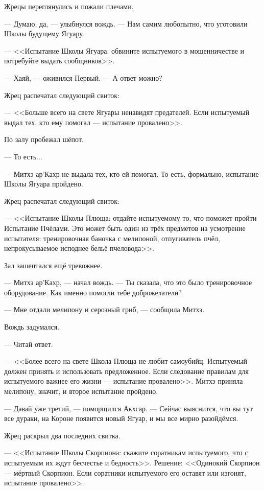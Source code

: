 Жрецы переглянулись и пожали плечами.

--- Думаю, да, --- улыбнулся вождь.
--- Нам самим любопытно, что уготовили Школы будущему Ягуару.

\textspace

--- <<Испытание Школы Ягуара: обвините испытуемого в мошенничестве и потребуйте выдать сообщников>>.

--- Хаяй, --- оживился Первый.
--- А ответ можно?

Жрец распечатал следующий свиток:

--- <<Больше всего на свете Ягуары ненавидят предателей.
Если испытуемый выдал тех, кто ему помогал --- испытание провалено>>.

По залу пробежал шёпот.

--- То есть...

--- Митхэ ар'Кахр не выдала тех, кто ей помогал.
То есть, формально, испытание Школы Ягуара пройдено.

Жрец распечатал следующий свиток:

--- <<Испытание Школы Плюща: отдайте испытуемому то, что поможет пройти Испытание Пчёлами.
Это может быть один из трёх предметов на усмотрение испытателя: тренировочная баночка с мелипоной, отпугиватель пчёл, непрокусываемое исподнее бельё пчеловода>>.

Зал зашептался ещё тревожнее.

--- Митхэ ар'Кахр, --- начал вождь.
--- Ты сказала, что это было тренировочное оборудование.
Как именно помогли тебе доброжелатели?

--- Мне отдали мелипону и серозный гриб, --- сообщила Митхэ.

Вождь задумался.

--- Читай ответ.

--- <<Более всего на свете Школа Плюща не любит самоубийц.
Испытуемый должен принять и использовать предложенное.
Если следование правилам для испытуемого важнее его жизни --- испытание провалено>>.
Митхэ приняла мелипону, значит, и второе испытание пройдено.

--- Давай уже третий, --- поморщился Акхсар.
--- Сейчас выяснится, что вы тут все дураки, на Короне появится новый Ягуар, и мы все мирно разойдёмся.

Жрец раскрыл два последних свитка.

--- <<Испытание Школы Скорпиона: скажите соратникам испытуемого, что с испытуемым их ждут бесчестье и бедность>>.
Решение:
<<Одинокий Скорпион --- мёртвый Скорпион.
Если соратники испытуемого его оставят или изгонят, испытание провалено>>.

